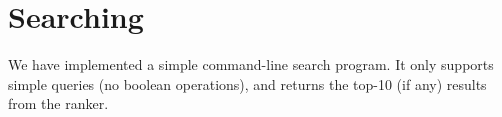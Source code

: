 \section{Searching}
We have implemented a simple command-line search program. It only supports simple queries (no boolean operations), and returns the top-10 (if any) results from the ranker.